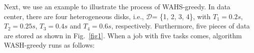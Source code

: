 \documentclass[conference]{IEEEtran}
\begin{document}


Next, we use an example to illustrate the process of WAHS-greedy. In data center, there are four heterogeneous disks, i.e., $\mathcal{D}$= \{1, 2, 3, 4\}, with $T_1 = 0.2s$,  $T_2 = 0.25s$,  $T_3 = 0.4s$ and $T_4 = 0.6s$, respectively. Furthermore, five pieces of data are stored as shown in Fig.~\ref{fig1}. When a job with five tasks comes, algorithm WASH-greedy runs as follows: %
\end{document}
